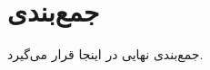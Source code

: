 \documentclass{article}[a4paper, 11px]
\begin{document}
\section{
جمع‌بندی
}

جمع‌بندی نهایی در اینجا قرار می‌گیرد.
\end{document}

